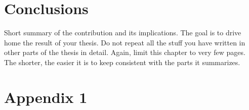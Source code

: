 \documentclass[12pt]{article}
\begin{document}
\pagebreak




\section{Conclusions}
\label{sec:7}
Short summary of the contribution and its implications. The goal is to drive home the result of your thesis.
Do not repeat all the stuff you have written in other parts of the thesis in detail. Again, limit this chapter to very few pages. 
The shorter, the easier it is to keep consistent with the parts it summarizes.

\pagebreak








\pagebreak


\appendix

\section{Appendix 1}
\end{document}
